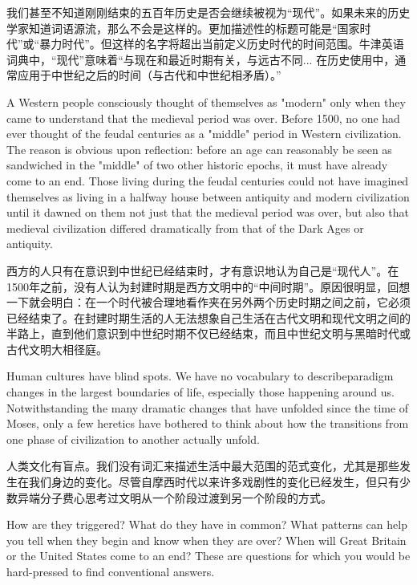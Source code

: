 \begin{Parallel}{97mm}{72mm}
  \ParallelRText
  {我们甚至不知道刚刚结束的五百年历史是否会继续被视为“现代”。如果未来的历史学家知道词语源流，那么不会是这样的。更加描述性的标题可能是“国家时代”或“暴力时代”。但这样的名字将超出当前定义历史时代的时间范围。牛津英语词典中，“现代”意味着“与现在和最近时期有关，与远古不同... 在历史使用中，通常应用于中世纪之后的时间（与古代和中世纪相矛盾）。”}

  \ParallelPar 


  \ParallelLText
  {A Western people consciously thought of themselves as "modern" only when they came to understand that the medieval period was over. Before 1500, no one had ever thought of the feudal centuries as a "middle" period in Western civilization. The reason is obvious upon reflection: before an age can reasonably be seen as sandwiched in the "middle" of two other historic epochs, it must have already come to an end. Those living during the feudal centuries could not have imagined themselves as living in a halfway house between antiquity and modern civilization until it dawned on them not just that the medieval period was over, but also that medieval civilization differed dramatically from that of the Dark Ages or antiquity.}
  
  \ParallelRText
  {西方的人只有在意识到中世纪已经结束时，才有意识地认为自己是“现代人”。在1500年之前，没有人认为封建时期是西方文明中的“中间时期”。原因很明显，回想一下就会明白：在一个时代被合理地看作夹在另外两个历史时期之间之前，它必须已经结束了。在封建时期生活的人无法想象自己生活在古代文明和现代文明之间的半路上，直到他们意识到中世纪时期不仅已经结束，而且中世纪文明与黑暗时代或古代文明大相径庭。}

  \ParallelPar

  \ParallelLText
  {Human cultures have blind spots. We have no vocabulary to describeparadigm changes in the largest boundaries of life, especially those happening around us. Notwithstanding the many dramatic changes that have unfolded since the time of Moses, only a few heretics have bothered to think about how the transitions from one phase of civilization to another actually unfold.}


  \ParallelRText
  {人类文化有盲点。我们没有词汇来描述生活中最大范围的范式变化，尤其是那些发生在我们身边的变化。尽管自摩西时代以来许多戏剧性的变化已经发生，但只有少数异端分子费心思考过文明从一个阶段过渡到另一个阶段的方式。}

  \ParallelPar  

  \ParallelLText
  {How are they triggered? What do they have in common? What patterns can help you tell when they begin and know when they are over? When will Great Britain or the United States come to an end? These are questions for which you would be hard-pressed to find conventional answers.}
 

\end{Parallel}
